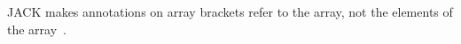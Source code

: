 \documentclass[10pt]{article}
\newcommand{\preverbnegspace}{\vspace{-5pt}}
\begin{document}
JACK makes annotations on array brackets refer to the array, not the
elements of the array~\cite{MalePPD2008}.



% 






% 
% 
% 
% 
% 
% 
% 
% 
% 
\end{document}
